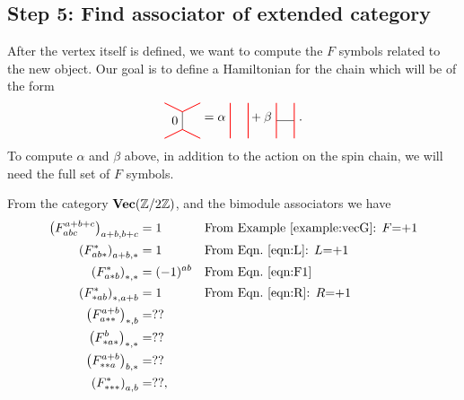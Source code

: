 \subsection*{Step 5: Find associator of extended category} After the vertex itself is defined, we want to compute the $F$ symbols related to the new object. 
Our goal is to define a Hamiltonian for the chain which will be of the form
	\begin{equation*}
		\begin{tikzpicture}[scale=1,baseline=(current bounding box.center)]
		\draw (.5,.25)--(.5,.75) node [pos=.5,left]{0};
		\draw [red, line width=0.25mm] (0,0) -- (.5,.25) -- (1,0);
		\draw [red, line width=0.25mm] (0,1) -- (.5,.75)--(1,1);
		\end{tikzpicture}
		=
		\alpha\ \begin{tikzpicture}[scale=1,baseline=(current bounding box.center)]
			\draw [red, line width=0.25mm] (0,0) -- (0,1);
			\draw [red, line width=0.25mm] (0.5,0) -- (0.5,1);
		\end{tikzpicture}
		+\beta\ \begin{tikzpicture}[scale=1,baseline=(current bounding box.center)]
			\draw (0,0.5) -- (0.5,0.5);
			\draw [red, line width=0.25mm] (0,0) -- (0,1);
			\draw [red, line width=0.25mm] (0.5,0) -- (0.5,1);			
		\end{tikzpicture}\ .
	\end{equation*}
To compute $\alpha$ and $\beta$ above, in addition to the action on the spin chain, we will need the full set of $F$ symbols.

From the category $\textbf{Vec}(\mathbb{Z}/2\mathbb{Z})$, and the bimodule associators we have
\begin{align}
\left(F_{abc}^{a+b+c}\right)_{a+b,b+c}&=1&&\text{From Example~\ref{example:vecG}: $F$=+1}\\
\left(F_{ab*}^*\right)_{a+b,*}&=1&&\text{From Eqn.~\ref{eqn:L}: $L$=+1} \\
\left(F_{a*b}^*\right)_{*,*}&=(-1)^{ab}&&\text{From Eqn.~\ref{eqn:F1}} \\
\left(F_{*ab}^*\right)_{*,a+b}&=1&&\text{From Eqn.~\ref{eqn:R}: $R$=+1} \\
\left(F_{a**}^{a+b}\right)_{*,b}&=??\\
\left(F_{*a*}^b\right)_{*,*}&=??\\
\left(F_{**a}^{a+b}\right)_{b,*}&=??\\
\left(F_{***}^*\right)_{a,b}&=??,
\end{align}
	

